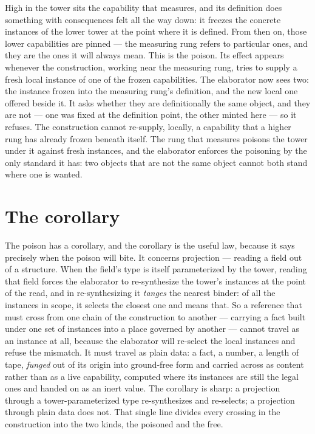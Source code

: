 High in the tower sits the capability that measures, and its definition does something with consequences
felt all the way down: it freezes the concrete instances of the lower tower at the point where it is
defined. From then on, those lower capabilities are pinned --- the measuring rung refers to particular ones,
and they are the ones it will always mean. This is the poison. Its effect appears whenever the construction,
working near the measuring rung, tries to supply a fresh local instance of one of the frozen capabilities.
The elaborator now sees two: the instance frozen into the measuring rung's definition, and the new local one
offered beside it. It asks whether they are definitionally the same object, and they are not --- one was
fixed at the definition point, the other minted here --- so it refuses. The construction cannot re-supply,
locally, a capability that a higher rung has already frozen beneath itself. The rung that measures poisons
the tower under it against fresh instances, and the elaborator enforces the poisoning by the only standard
it has: two objects that are not the same object cannot both stand where one is wanted.

\section{The corollary}
\label{se:the-corollary}

The poison has a corollary, and the corollary is the useful law, because it says precisely when the poison
will bite. It concerns projection --- reading a field out of a structure. When the field's type is itself
parameterized by the tower, reading that field forces the elaborator to re-synthesize the tower's instances
at the point of the read, and in re-synthesizing it \emph{tanges} the nearest binder: of all the instances
in scope, it selects the closest one and means that. So a reference that must cross from one chain of the
construction to another --- carrying a fact built under one set of instances into a place governed by
another --- cannot travel as an instance at all, because the elaborator will re-select the local instances
and refuse the mismatch. It must travel as plain data: a fact, a number, a length of tape, \emph{funged}
out of its origin into ground-free form and carried across as content rather than as a live capability,
computed where its instances are still the legal ones and handed on as an inert value. The corollary is
sharp: a projection through a tower-parameterized type re-synthesizes and re-selects; a projection through
plain data does not. That single line divides every crossing in the construction into the two kinds, the
poisoned and the free.

